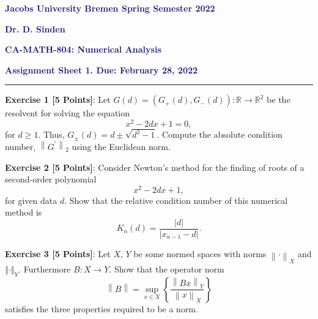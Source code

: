\documentclass{article}
\begin{document}
\noindent\textsf{\textbf{\textcolor{MidnightBlue}{Jacobs University Bremen \hfill Spring Semester 2022}}}

\vspace{1\baselineskip}
\noindent{}\textsf{\textbf{\textcolor{MidnightBlue}{Dr. D. Sinden}}}

\begin{center}
{\Large \textbf{\textsf{\textcolor{MidnightBlue}{CA-MATH-804: Numerical Analysis}}}}
\end{center}

\begin{flushright}
\textbf{\textsf{\textcolor{MidnightBlue}{Assignment Sheet 1. Due: February 28, 2022}}}
\end{flushright}

\begin{center}
\textcolor{MidnightBlue}{\rule[0.5\baselineskip]{1.0cm}{0.4pt}}
\end{center}

\vspace{1\baselineskip}
\noindent\textsf{\textbf{Exercise 1 [5 Points]}}: Let ${ G \left( d \right) = \left( G_{+}(d), G_{-}(d) \right) : \mathbb{R} \rightarrow \mathbb{R}^{2} }$ be the resolvent for solving the equation
\begin{equation}
x^2 - 2 d x + 1 = 0, \nonumber
\end{equation}
for $d \ge 1$. Thus, $G_{\pm}(d) = d \pm \sqrt{d^2 - 1}$. Compute the absolute condition number, $\left\| G^\prime \right\|_2$ using the Euclidean norm. 


\vspace{1\baselineskip}
\noindent\textsf{\textbf{Exercise 2 [5 Points]}}: Consider Newton's method for the finding of roots of a second-order polynomial
\begin{equation}
x^2 - 2 d x + 1, \nonumber
\end{equation}
for given data $d$. Show that the relative condition number of this numerical method is
\begin{equation}
K_n \left(d\right) = \dfrac{|d|}{|x_{n-1} - d|}. \nonumber 
\end{equation}

\vspace{1\baselineskip}
\noindent\textsf{\textbf{Exercise 3 [5 Points]}}: Let $X$, $Y$ be some normed spaces with norms ${\left\| \cdot \right\|_X}$ and ${\left\Vert \cdot \right\Vert_Y}$. Furthermore $B : X \rightarrow Y$. Show that the operator norm
\begin{equation}
\left\| B \right\| = \sup_{x \in X} \left\{ \dfrac{\left\| B x \right\|_Y}{\left\| x\right\|_X} \right\}
\nonumber 
\end{equation}
satisfies the three properties required to be a norm.
\end{document}
